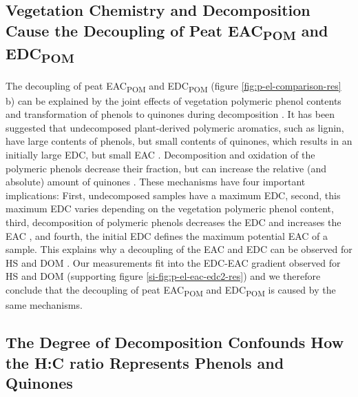 \documentclass[draft,linenumbers]{agujournal2018}
\begin{document}
\subsection{\texorpdfstring{Vegetation Chemistry and Decomposition Cause
the Decoupling of Peat EAC\textsubscript{POM} and
EDC\textsubscript{POM}}{Vegetation Chemistry and Decomposition Cause the Decoupling of Peat EAC and EDC}}

The decoupling of peat EAC\textsubscript{POM} and EDC\textsubscript{POM}
(figure \ref{fig:p-el-comparison-res} b) can be explained by the joint
effects of vegetation polymeric phenol contents and transformation of
phenols to quinones during decomposition \citep{Aeschbacher.2012}. It
has been suggested that undecomposed plant-derived polymeric aromatics,
such as lignin, have large contents of phenols, but small contents of
quinones, which results in an initially large EDC, but small EAC
\citep{Aeschbacher.2012}. Decomposition and oxidation of the polymeric
phenols decrease their fraction, but can increase the relative (and
absolute) amount of quinones
\citep{Aeschbacher.2012, Bolton.2018, LaCroix.2020}. These mechanisms
have four important implications: First, undecomposed samples have a
maximum EDC, second, this maximum EDC varies depending on the vegetation
polymeric phenol content, third, decomposition of polymeric phenols
decreases the EDC and increases the EAC \citep{Aeschbacher.2012}, and
fourth, the initial EDC defines the maximum potential EAC of a sample.
This explains why a decoupling of the EAC and EDC can be observed for HS
and DOM \citep{Aeschbacher.2012}. Our measurements fit into the EDC-EAC
gradient observed for HS and DOM (supporting figure
\ref{si-fig:p-el-eac-edc2-res}) and we therefore conclude that the
decoupling of peat EAC\textsubscript{POM} and EDC\textsubscript{POM} is
caused by the same mechanisms.

\subsection{The Degree of Decomposition Confounds How the H:C ratio
Represents Phenols and Quinones}
\end{document}
